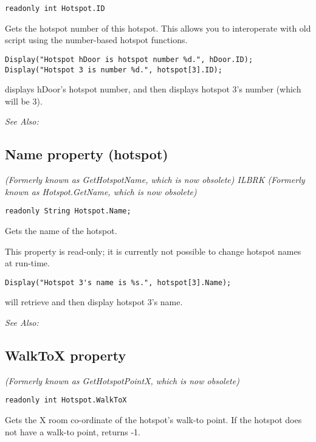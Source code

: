 \begin{verbatim}
readonly int Hotspot.ID
\end{verbatim}
Gets the hotspot number of this hotspot. This allows you to interoperate with old
script using the number-based hotspot functions.

\begin{verbatim}
Display("Hotspot hDoor is hotspot number %d.", hDoor.ID);
Display("Hotspot 3 is number %d.", hotspot[3].ID);
\end{verbatim}
displays hDoor's hotspot number, and then displays hotspot 3's number (which will be 3).

\it{See Also:} 


\subsection{Name property (hotspot)}\label{Hotspot.Name}%

\it{(Formerly known as GetHotspotName, which is now obsolete)} ILBRK
\it{(Formerly known as Hotspot.GetName, which is now obsolete)}

\begin{verbatim}
readonly String Hotspot.Name;
\end{verbatim}
Gets the name of the hotspot.

This property is read-only; it is currently not possible to change hotspot names at run-time.

\begin{verbatim}
Display("Hotspot 3's name is %s.", hotspot[3].Name);
\end{verbatim}
will retrieve and then display hotspot 3's name.

\it{See Also:} 


\subsection{WalkToX property}\label{Hotspot.WalkToX}%

\it{(Formerly known as GetHotspotPointX, which is now obsolete)}

\begin{verbatim}
readonly int Hotspot.WalkToX
\end{verbatim}
Gets the X room co-ordinate of the hotspot's walk-to point. If the hotspot
does not have a walk-to point, returns -1.

